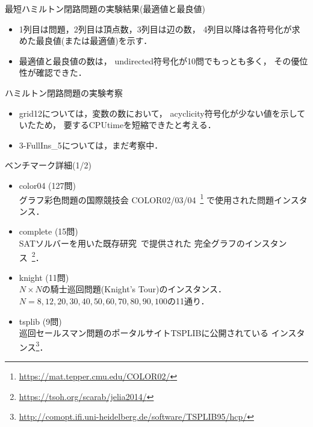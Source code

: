 \documentclass[dvipdfmx,10pt]{beamer}
\begin{document}
\begin{frame}[noframenumbering]{最短ハミルトン閉路問題の実験結果(最適値と最良値)}

\begin{itemize}
\item 1列目は問題，2列目は頂点数，3列目は辺の数，
  4列目以降は各符号化が求めた最良値(または最適値)を示す．
\item 最適値と最良値の数は，
\textsf{undirected}符号化が10問でもっとも多く，
その優位性が確認できた．
\end{itemize}
    
\end{frame}

\begin{frame}[noframenumbering]{ハミルトン閉路問題の実験考察}


\begin{itemize}
\item \textsf{grid12}については，変数の数において，
  \textsf{acyclicity}符号化が少ない値を示していたため，
  要するCPUtimeを短縮できたと考える．
\item \textsf{3-FullIns\_5}については，まだ考察中．
\end{itemize}
\end{frame}

\begin{frame}[noframenumbering]{ベンチマーク詳細(1/2)}
\begin{itemize}
\item \textsf{color04} (127問)\\
  グラフ彩色問題の国際競技会
  COLOR02/03/04~\footnote{\url{https://mat.tepper.cmu.edu/COLOR02/}}
  で使用された問題インスタンス．
\item \textsf{complete} (15問)\\
  SATソルバーを用いた既存研究~\cite{soh14:jelia2014}で提供された
  完全グラフのインスタンス~\footnote{\url{https://tsoh.org/scarab/jelia2014/}}．
\item \textsf{knight} (11問)\\
  $N\times N$の騎士巡回問題(Knight's Tour)のインスタンス．\\
  $N=8,12,20,30,40,50,60,70,80,90,100$の11通り．
\item \textsf{tsplib} (9問)\\
  巡回セールスマン問題のポータルサイトTSPLIBに公開されている
  インスタンス\footnote{\url{http://comopt.ifi.uni-heidelberg.de/software/TSPLIB95/hcp/}}．
\end{itemize}  
\end{frame}
\end{document}
